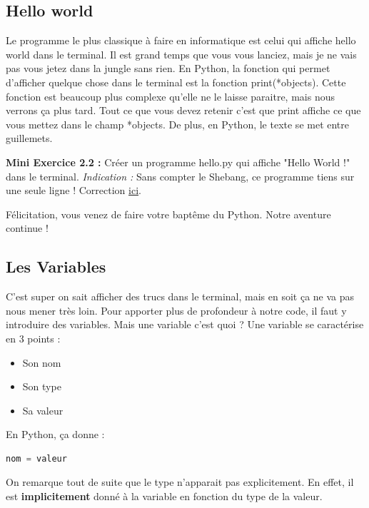 \documentclass[a4paper,12pt]{article}
\begin{document}
\subsection{Hello world}

Le programme le plus classique à faire en informatique est celui qui affiche hello world dans le terminal. Il est grand temps que vous vous lanciez, mais je ne vais pas vous jetez dans la jungle sans rien.
En Python, la fonction qui permet d'afficher quelque chose dans le terminal est la fonction {\color{blue} print(*objects)}. 
Cette fonction est beaucoup plus complexe qu'elle ne le laisse paraitre, mais nous verrons ça plus tard. Tout ce que vous devez retenir c'est que print affiche ce que vous mettez dans le champ *objects.
De plus, en Python, le texte se met entre guillemets.

{\color{darkgreen}
\noindent\textbf{Mini Exercice 2.2 : } Créer un programme hello.py qui affiche "Hello World !" dans le terminal. \newline
\textit{Indication : } Sans compter le Shebang, ce programme tiens sur une seule ligne ! \newline
Correction \hyperlink{AncreExo2.2}{ici}.\newline
}

Félicitation, vous venez de faire votre baptême du Python. Notre aventure continue !

\subsection{Les Variables}

C'est super on sait afficher des trucs dans le terminal, mais en soit ça ne va pas nous mener très loin.
Pour apporter plus de profondeur à notre code, il faut y introduire des variables. Mais une variable c'est quoi ? Une variable se caractérise en 3 points :
\begin{itemize}
    \item Son nom
    \item Son type
    \item Sa valeur
\end{itemize}
En Python, ça donne :
\begin{lstlisting}[language=Python]
    nom = valeur
\end{lstlisting}
{\color{cyan}
On remarque tout de suite que le type n'apparait pas explicitement. En effet, il est \textbf{implicitement} donné à la variable en fonction du type de la valeur.\newline
}
\end{document}

